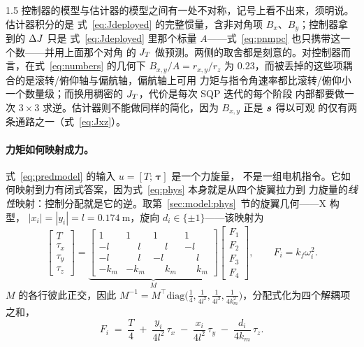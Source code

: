 \begin{spacing}{1.5}
控制器的模型与估计器的模型之间有一处不对称，记号上看不出来，须明说。估计器积分的是
式~\eqref{eq:Jdeployed} 的完整惯量，含非对角项 $B_x$、$B_y$；控制器拿到的 $\Delta J$ 只是
式~\eqref{eq:Jdeployed} 里那个标量 $A$——式~\eqref{eq:pnmpc} 也只携带这一个数——并用上面那个对角
的 $J_T$ 做预测。两侧的取舍都是刻意的。对控制器而言，在式~\eqref{eq:numbers} 的几何下
$B_{x,y}/A = r_{x,y}/r_z$ 为 $0.23$，而被丢掉的这些项耦合的是滚转/俯仰轴与偏航轴，偏航轴上可用
力矩与指令角速率都比滚转/俯仰小一个数量级；而换用稠密的 $J_T$，代价是每次 SQP 迭代的每个阶段
内部都要做一次 $3\times 3$ 求逆。估计器则不能做同样的简化，因为 $B_{x,y}$ 正是 $\bm{s}$ 得以可观
的仅有两条通路之一（式~\eqref{eq:Jxz}）。

\paragraph{力矩如何映射成力。}式~\eqref{eq:predmodel} 的输入 $u = [T;\,\bm\tau]$ 是一个力旋量，
不是一组电机指令。它如何映射到力有闭式答案，因为式~\eqref{eq:phys} 本身就是从四个旋翼拉力到
力旋量的\emph{线性}映射：控制分配就是它的逆。取第~\ref{sec:model:phys}~节的旋翼几何——X 构型，
$|x_i| = |y_i| = l = \SI{0.174}{\meter}$，旋向 $d_i \in \{\pm 1\}$——该映射为
\begin{equation}
\begin{bmatrix} T \\ \tau_x \\ \tau_y \\ \tau_z \end{bmatrix}
=
\underbrace{
\begin{bmatrix}
1 & 1 & 1 & 1 \\
-l & \phantom{-}l & \phantom{-}l & -l \\
-l & \phantom{-}l & -l & \phantom{-}l \\
-k_m & -k_m & \phantom{-}k_m & \phantom{-}k_m
\end{bmatrix}}_{M}
\begin{bmatrix} F_1 \\ F_2 \\ F_3 \\ F_4 \end{bmatrix},
\qquad F_i = k_f \omega_i^2 .
\label{eq:mixer}
\end{equation}
$M$ 的各行彼此正交，因此
$M^{-1} = M^{\!\top}\mathrm{diag}\bigl(\tfrac{1}{4}, \tfrac{1}{4l^2},
\tfrac{1}{4l^2}, \tfrac{1}{4k_m^2}\bigr)$，分配式化为四个解耦项之和，
\begin{equation}
F_i \;=\; \frac{T}{4}
 \;+\; \frac{y_i}{4l^2}\,\tau_x
 \;-\; \frac{x_i}{4l^2}\,\tau_y
 \;-\; \frac{d_i}{4k_m}\,\tau_z .
\label{eq:mixerinv}
\end{equation}


\end{spacing}
